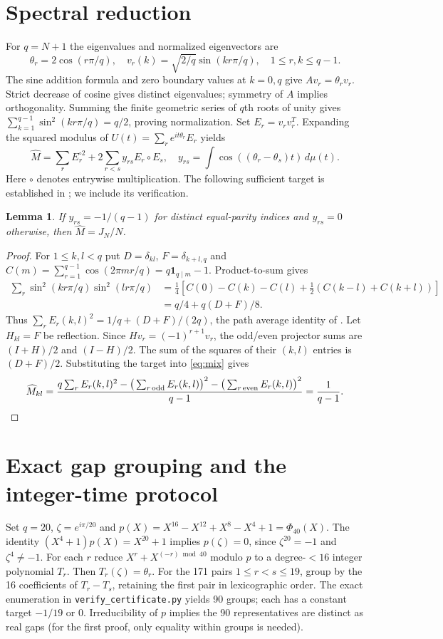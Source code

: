 \documentclass[11pt,a4paper]{article}
\newtheorem{lemma}{Lemma}
\begin{document}
\section{Spectral reduction}
For $q=N+1$ the eigenvalues and normalized eigenvectors are
\[
\theta_r=2\cos(r\pi/q),\quad v_r(k)=\sqrt{2/q}\sin(kr\pi/q),\quad 1\le r,k\le q-1.
\]
The sine addition formula and zero boundary values at $k=0,q$ give $Av_r=\theta_rv_r$. Strict decrease of cosine gives distinct eigenvalues; symmetry of $A$ implies orthogonality. Summing the finite geometric series of $q$th roots of unity gives $\sum_{k=1}^{q-1}\sin^2(kr\pi/q)=q/2$, proving normalization. Set $E_r=v_rv_r^T$. Expanding the squared modulus of $U(t)=\sum_r e^{it\theta_r}E_r$ yields
\begin{equation}\label{eq:mix}
\widehat M=\sum_r E_r^{\circ2}+2\sum_{r<s}y_{rs} E_r\circ E_s,\quad
y_{rs}=\int\cos((\theta_r-\theta_s)t)\,d\mu(t).
\end{equation}
Here $\circ$ denotes entrywise multiplication. The following sufficient target is established in \cite{kang}; we include its verification.
\begin{lemma}\label{lem:target}
If $y_{rs}=-1/(q-1)$ for distinct equal-parity indices and $y_{rs}=0$ otherwise, then $\widehat M=J_N/N$.
\end{lemma}
\begin{proof}
For $1\le k,l<q$ put $D=\delta_{kl}$, $F=\delta_{k+l,q}$ and $C(m)=\sum_{r=1}^{q-1}\cos(2\pi mr/q)=q\mathbf1_{q\mid m}-1$. Product-to-sum gives
\begin{align*}
\sum_r\sin^2(kr\pi/q)\sin^2(lr\pi/q)
&=\tfrac14[C(0)-C(k)-C(l)+\tfrac12(C(k-l)+C(k+l))]\\
&=q/4+q(D+F)/8.
\end{align*}
Thus $\sum_r E_r(k,l)^2=1/q+(D+F)/(2q)$, the path average identity of \cite{godsil}. Let $H_{kl}=F$ be reflection. Since $Hv_r=(-1)^{r+1}v_r$, the odd/even projector sums are $(I+H)/2$ and $(I-H)/2$. The sum of the squares of their $(k,l)$ entries is $(D+F)/2$. Substituting the target into \eqref{eq:mix} gives
\[
\widehat M_{kl}=\frac{q\sum_r E_r(k,l)^2-\big(\sum_{r\,\mathrm{odd}}E_r(k,l)\big)^2-\big(\sum_{r\,\mathrm{even}}E_r(k,l)\big)^2}{q-1}=\frac1{q-1}.\qedhere
\]
\end{proof}
\section{Exact gap grouping and the integer-time protocol}
Set $q=20$, $\zeta=e^{i\pi/20}$ and $p(X)=X^{16}-X^{12}+X^8-X^4+1=\Phi_{40}(X)$. The identity $(X^4+1)p(X)=X^{20}+1$ implies $p(\zeta)=0$, since $\zeta^{20}=-1$ and $\zeta^4\ne-1$. For each $r$ reduce $X^r+X^{(-r)\bmod40}$ modulo $p$ to a degree-$<16$ integer polynomial $T_r$. Then $T_r(\zeta)=\theta_r$. For the 171 pairs $1\le r<s\le19$, group by the 16 coefficients of $T_r-T_s$, retaining the first pair in lexicographic order. The exact enumeration in \texttt{verify\_certificate.py} yields 90 groups; each has a constant target $-1/19$ or 0. Irreducibility of $p$ implies the 90 representatives are distinct as real gaps (for the first proof, only equality within groups is needed).
\end{document}

